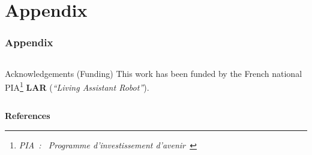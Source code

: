 \documentclass[10pt,c]{beamer}
\begin{document}

\appendix


\section{Appendix}

\begin{frame}[allowframebreaks]
\frametitle{Appendix}
\begin{columns}[c]
\begin{column}{8.25cm}
\begin{block}{Acknowledgements (Funding)}
This work has been funded by the French national PIA\footnote{\textsl{PIA~:
\guillemotleft~Programme d'investissement d'avenir~\guillemotright}}
\textbf{LAR} (\textit{``Living Assistant Robot''}).
\end{block}
\end{column}
\end{columns}

\vspace{0.75cm}

\textbf{References}
\vspace{0.25cm}
\tiny


\end{frame}


\end{document}

